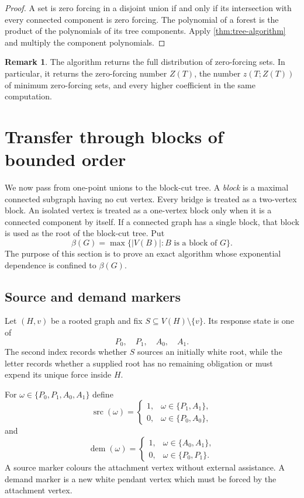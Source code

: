 \documentclass[11pt,reqno]{amsart}
\theoremstyle{definition}
\newtheorem{remark}[remark]{Remark}
\begin{document}
\begin{proof}
A set is zero forcing in a disjoint union if and only if its intersection with every connected component is zero forcing.  The polynomial of a forest is the product of the polynomials of its tree components.  Apply \cref{thm:tree-algorithm} and multiply the component polynomials.
\end{proof}

\begin{remark}
The algorithm returns the full distribution of zero-forcing sets.  In particular, it returns the zero-forcing number $Z(T)$, the number $z(T;Z(T))$ of minimum zero-forcing sets, and every higher coefficient in the same computation.
\end{remark}

\section{Transfer through blocks of bounded order}\label{sec:blocks}

We now pass from one-point unions to the block-cut tree.  A \emph{block} is a maximal connected subgraph having no cut vertex.  Every bridge is treated as a two-vertex block.  An isolated vertex is treated as a one-vertex block only when it is a connected component by itself.  If a connected graph has a single block, that block is used as the root of the block-cut tree.  Put
\[
  \beta(G)=\max\{|V(B)|:B\text{ is a block of }G\}.
\]
The purpose of this section is to prove an exact algorithm whose exponential dependence is confined to $\beta(G)$.

\subsection{Source and demand markers}

Let $(H,v)$ be a rooted graph and fix $S\subseteq V(H)\setminus\{v\}$.  Its response state is one of
\[
  P_0,\quad P_1,\quad A_0,\quad A_1.
\]
The second index records whether $S$ sources an initially white root, while the letter records whether a supplied root has no remaining obligation or must expend its unique force inside $H$.

For $\omega\in\{P_0,P_1,A_0,A_1\}$ define
\[
  \operatorname{src}(\omega)=
  \begin{cases}
  1,&\omega\in\{P_1,A_1\},\\
  0,&\omega\in\{P_0,A_0\},
  \end{cases}
\]
and
\[
  \operatorname{dem}(\omega)=
  \begin{cases}
  1,&\omega\in\{A_0,A_1\},\\
  0,&\omega\in\{P_0,P_1\}.
  \end{cases}
\]
A source marker colours the attachment vertex without external assistance.  A demand marker is a new white pendant vertex which must be forced by the attachment vertex.
\end{document}
